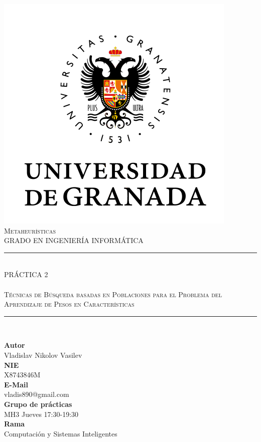 \documentclass[11pt,a4paper]{article}
\newcommand{\asignatura}{Metaheurísticas}
\newcommand{\autor}{Vladislav Nikolov Vasilev}
\begin{document}

\begin{titlepage}

\begin{minipage}{\textwidth}

\centering

\includegraphics[scale=0.3]{img/ugr.png}\\

\textsc{\Large \asignatura{}\\[0.2cm]}
\textsc{GRADO EN INGENIERÍA INFORMÁTICA}\\[0.3cm]

\noindent\rule[-1ex]{\textwidth}{1pt}\\[1.5ex]
\textsc{{\Huge PRÁCTICA 2\\[1pt]}}
\textsc{{\Large \\Técnicas de Búsqueda basadas en Poblaciones para el Problema del Aprendizaje de Pesos en Características}}
\noindent\rule[-1ex]{\textwidth}{2pt}\\[1ex]

\end{minipage}

\vspace{0.18cm}

\begin{minipage}{\textwidth}

\centering

\textbf{Autor}\\ {\autor{}}\\[1ex]
\textbf{NIE}\\ {X8743846M}\\[1ex]
\textbf{E-Mail}\\ {vladis890@gmail.com}\\[1ex]
\textbf{Grupo de prácticas}\\ {MH3 Jueves 17:30-19:30}\\[1ex]
\textbf{Rama}\\ {Computación y Sistemas Inteligentes}\\[1ex]
\vspace{0.2cm}


\end{minipage}
\end{titlepage}
\end{document}
